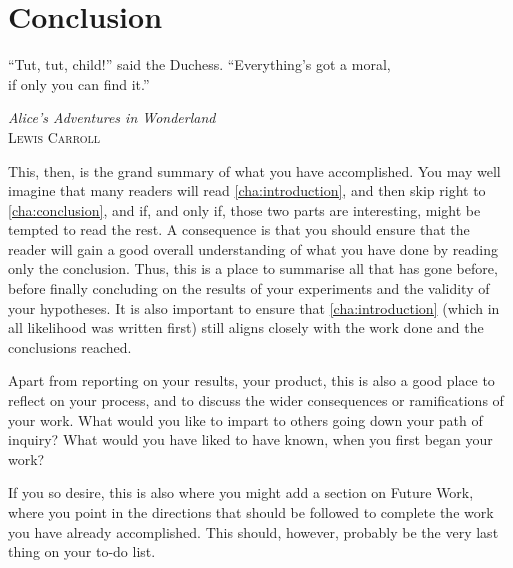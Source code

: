 \chapter{Conclusion}
\label{cha:conclusion}
\epigraph{``Tut, tut, child!'' said the Duchess. ``Everything’s got a
moral,\\if only you can find it.''}{\textit{Alice’s Adventures in Wonderland}\\\textsc{Lewis Carroll}}

This, then, is the grand summary of what you have accomplished.  You may
well imagine that many readers will read \autoref{cha:introduction}, and
then skip right to \autoref{cha:conclusion}, and if, and only if, those two
parts are interesting, might be tempted to read the rest. A consequence is
that you should ensure that the reader will gain a good overall
understanding of what you have done by reading only the conclusion.  Thus,
this is a place to summarise all that has gone before, before finally
concluding on the results of your experiments and the validity of your
hypotheses. It is also important to ensure that \autoref{cha:introduction}
(which in all likelihood was written first) still aligns closely with the
work done and the conclusions reached.

Apart from reporting on your results, \ie your product, this is also a good
place to reflect on your process, and to discuss the wider consequences or
ramifications of your work. What would you like to impart to others going
down your path of inquiry? What would you have liked to have known, when you
first began your work?

If you so desire, this is also where you might add a section on Future Work,
where you point in the directions that should be followed to complete the
work you have already accomplished. This should, however, probably be the
very last thing on your to-do list.



